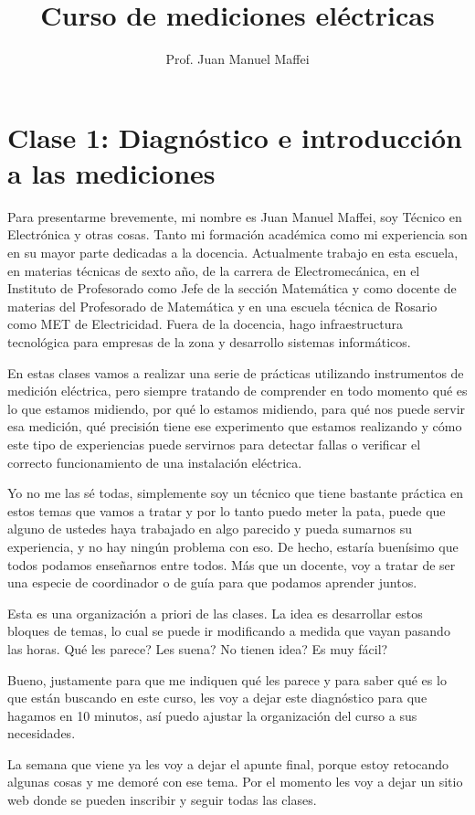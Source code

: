 \documentclass[11pt,a4paper]{book}
\author{Prof. Juan Manuel Maffei}
\title{Curso de mediciones eléctricas}
\begin{document}
	\newtheorem{ejemplo}{Ejemplo}[chapter]
		
	\chapter{Clase 1: Diagnóstico e introducción a las mediciones}
	
	Para presentarme brevemente, mi nombre es Juan Manuel Maffei, soy Técnico en Electrónica y otras cosas. Tanto mi formación académica como mi experiencia son en su mayor parte dedicadas a la docencia. Actualmente trabajo en esta escuela, en materias técnicas de sexto año, de la carrera de Electromecánica, en el Instituto de Profesorado como Jefe de la sección Matemática y como docente de materias del Profesorado de Matemática y en una escuela técnica de Rosario como MET de Electricidad. Fuera de la docencia, hago infraestructura tecnológica para empresas de la zona y desarrollo sistemas informáticos.
		
	En estas clases vamos a realizar una serie de prácticas utilizando instrumentos de medición eléctrica, pero siempre tratando de comprender en todo momento qué es lo que estamos midiendo, por qué lo estamos midiendo, para qué nos puede servir esa medición, qué precisión tiene ese experimento que estamos realizando y cómo este tipo de experiencias puede servirnos para detectar fallas o verificar el correcto funcionamiento de una instalación eléctrica.
	
	Yo no me las sé todas, simplemente soy un técnico que tiene bastante práctica en estos temas que vamos a tratar y por lo tanto puedo meter la pata, puede que alguno de ustedes haya trabajado en algo parecido y pueda sumarnos su experiencia, y no hay ningún problema con eso. De hecho, estaría buenísimo que todos podamos enseñarnos entre todos. Más que un docente, voy a tratar de ser una especie de coordinador o de guía para que podamos aprender juntos.
	
	Esta es una organización a priori de las clases. La idea es desarrollar estos bloques de temas, lo cual se puede ir modificando a medida que vayan pasando las horas. Qué les parece? Les suena? No tienen idea? Es muy fácil?
	
	Bueno, justamente para que me indiquen qué les parece y para saber qué es lo que están buscando en este curso, les voy a dejar este diagnóstico para que hagamos en 10 minutos, así puedo ajustar la organización del curso a sus necesidades.
	
	La semana que viene ya les voy a dejar el apunte final, porque estoy retocando algunas cosas y me demoré con ese tema. Por el momento les voy a dejar un sitio web donde se pueden inscribir y seguir todas las clases.
	
\end{document}
